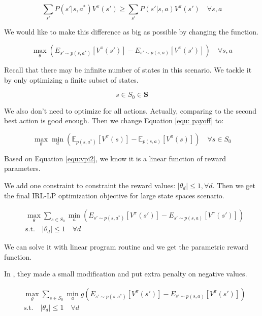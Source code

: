 \documentclass[11pt]{article}
\begin{document}
$$\sum_{s'} P(s'|s, a^*)V^\pi(s') \geq \sum_{s'} P(s'|s,a)V^\pi(s') \quad \forall{s,a}$$

We would like to make this difference as big as possible by changing the   function.

\begin{equation}
\max_\theta(E_{s'\sim p(s,a^*)}[V^\pi(s')] - E_{s'\sim p(s,a)}[V^\pi(s')]) \quad \forall{s,a}  
\label{equ: payoff}
\end{equation}


Recall that there may be infinite number of states in this scenario. We tackle it by only optimizing a finite subset of states.

$$s\in S_0 \in \mathbf{S}$$

We also don't need to optimize for all actions. Actually, comparing to the second best action is good enough. Then we change Equation \ref{equ: payoff} to:

$$\max_\theta \min_a (\mathbb{E}_{p(s,a^*)}[V^\pi(s)] - \mathbb{E}_{p(s,a)}[V^\pi(s)]) \quad \forall{s \in S_0}$$

Based on Equation \ref{equ:vpi2}, we know it is a linear function of reward parameters.

We add one constraint to constraint the reward values: $|\theta_d| \leq 1, \forall{d}.$ Then we get the final IRL-LP optimization objective for large state spaces scenario.

\begin{equation*}
\begin{aligned}
& \max_\theta \sum_{s\in S_0} \min_a (E_{s'\sim p(s,a^*)}[V^\pi(s')] - E_{s'\sim p(s,a)}[V^\pi(s')])\\
& \text{s.t.} \quad |\theta_d| \leq 1 \quad \forall{d}
\end{aligned}
\end{equation*}

We can solve it with linear program routine and we get the parametric reward function.

In \cite{ng2000algorithms}, they made a small modification and put extra penalty on negative values.

\begin{equation*}
\begin{aligned}
& \max_\theta \sum_{s\in S_0} \min_a g(E_{s'\sim p(s,a^*)}[V^\pi(s')] - E_{s'\sim p(s,a)}[V^\pi(s')])\\
& \text{s.t.} \quad |\theta_d| \leq 1 \quad \forall{d}
\end{aligned}
\end{equation*}
\end{document}
